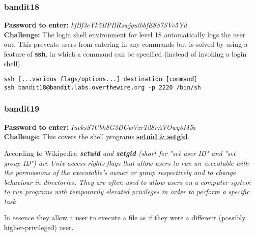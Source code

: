 \documentclass[a4paper]{article}
\newcommand{\pass}[1]{\textbf{Password to enter:} \textit{#1}\\}
\newcommand{\chall}{\textbf{Challenge:} }
\begin{document}
\subsubsection{bandit18}
\pass{kfBf3eYk5BPBRzwjqutbbfE887SVc5Yd}
\chall The login shell environment for level 18 automatically logs the user out. This prevents users from entering in any commands but is solved by using a feature of \textbf{ssh}, in which a command can be specified (instead of invoking a login shell).
\begin{lstlisting}
ssh [...various flags/options...] destination [command]
ssh bandit18@bandit.labs.overthewire.org -p 2220 /bin/sh
\end{lstlisting}

\subsubsection{bandit19}
\pass{IueksS7Ubh8G3DCwVzrTd8rAVOwq3M5x}
\chall This covers the shell programs \href{https://en.wikipedia.org/wiki/Setuid}{\textbf{setuid} \& \textbf{setgid}}. 

According to Wikipedia: \textit{\textbf{setuid} and \textbf{setgid} (short for "set user ID" and "set group ID") are Unix access rights flags that allow users to run an executable with the permissions of the executable's owner or group respectively and to change behaviour in directories. They are often used to allow users on a computer system to run programs with temporarily elevated privileges in order to perform a specific task}

In essence they allow a user to execute a file as if they were a different (possibly higher-privileged) user.
\end{document}
